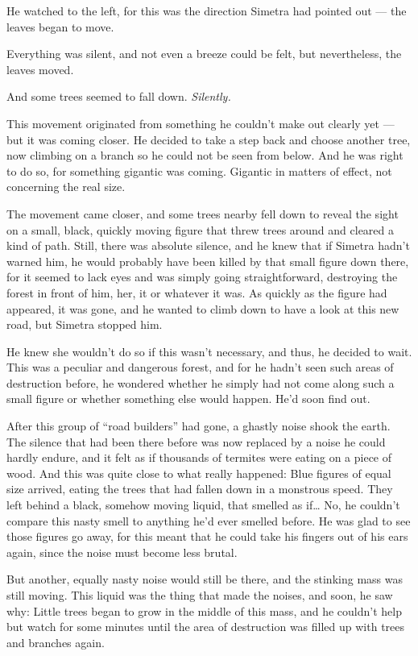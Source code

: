 He watched to the left, for this was the direction Simetra had pointed out --- the leaves began to move.

Everything was silent, and not even a breeze could be felt, but nevertheless, the leaves moved.

And some trees seemed to fall down. \emph{Silently.}

This movement originated from something he couldn't make out clearly yet --- but it was coming closer. He decided to take a step back and choose another tree, now climbing on a branch so he could not be seen from below.  And he was right to do so, for something gigantic was coming. Gigantic in matters of effect, not concerning the real size.

The movement came closer, and some trees nearby fell down to reveal the sight on a small, black, quickly moving figure that threw trees around and cleared a kind of path. Still, there was absolute silence, and he knew that if Simetra hadn't warned him, he would probably have been killed by that small figure down there, for it seemed to lack eyes and was simply going straightforward, destroying the forest in front of him, her, it or whatever it was. As quickly as the figure had appeared, it was gone, and he wanted to climb down to have a look at this new road, but Simetra stopped him.

He knew she wouldn't do so if this wasn't necessary, and thus, he decided to wait. This was a peculiar and dangerous forest, and for he hadn't seen such areas of destruction before, he wondered whether he simply had not come along such a small figure or whether something else would happen. 
He'd soon find out.

After this group of \enquote{road builders} had gone, a ghastly noise shook the earth. The silence that had been there before was now replaced by a noise he could hardly endure, and it felt as if thousands of termites were eating on a piece of wood. 
And this was quite close to what really happened: Blue figures of equal size arrived, eating the trees that had fallen down in a monstrous speed. They left behind a black, somehow moving liquid, that smelled as if\dots
No, he couldn't compare this nasty smell to anything he'd ever smelled before. He was glad to see those figures go away, for this meant that he could take his fingers out of his ears again, since the noise must become less brutal.

But another, equally nasty noise would still be there, and the stinking mass was still moving. This liquid was the thing that made the noises, and soon, he saw why: Little trees began to grow in the middle of this mass, and he couldn't help but watch for some minutes until the area of destruction was filled up with trees and branches again.

